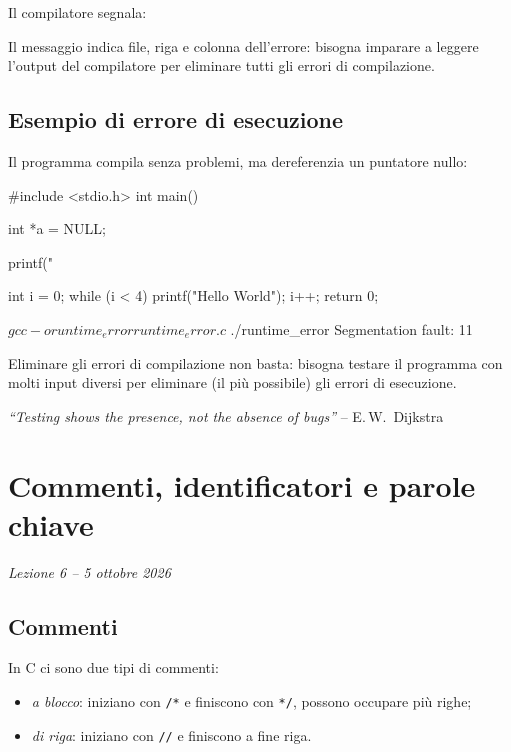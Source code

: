 \documentclass[11pt,a4paper]{article}
\begin{document}
Il compilatore segnala:

Il messaggio indica file, riga e colonna dell'errore: bisogna imparare a
leggere l'output del compilatore per eliminare tutti gli errori di compilazione.

\subsection{Esempio di errore di esecuzione}

Il programma compila senza problemi, ma dereferenzia un puntatore nullo:
\begin{codice}
#include <stdio.h>
int main() {
    int *a = NULL;

    printf("%

    int i = 0;
    while (i < 4) {
        printf("Hello World");
        i++;
    }
    return 0;
}
\end{codice}
\begin{risultato}
$ gcc -o runtime_error runtime_error.c
$ ./runtime_error
Segmentation fault: 11
\end{risultato}

\begin{osservazione}
Eliminare gli errori di compilazione non basta: bisogna testare il programma
con molti input diversi per eliminare (il più possibile) gli errori di
esecuzione.
\end{osservazione}

\begin{center}
\emph{``Testing shows the presence, not the absence of bugs''} -- E.\,W.\ Dijkstra
\end{center}

\section[Commenti, identificatori e parole chiave (Lezione 6 -- 5 ottobre 2026)]{Commenti, identificatori e parole chiave}
\noindent\emph{Lezione 6 -- 5 ottobre 2026}
\subsection{Commenti}

In C ci sono due tipi di commenti:
\begin{itemize}
    \item \emph{a blocco}: iniziano con \lstinline|/*| e finiscono con \lstinline|*/|, possono
          occupare più righe;
    \item \emph{di riga}: iniziano con \lstinline|//| e finiscono a fine riga.
\end{itemize}
\end{document}
